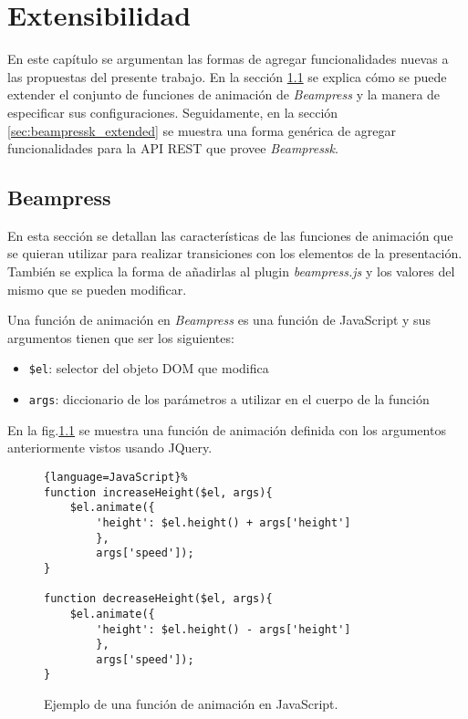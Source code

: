\chapter{Extensibilidad} %
\label{cha:extensibilidad}
 	En este capítulo se argumentan las formas de agregar funcionalidades nuevas a las propuestas del presente trabajo. En la sección \ref{sec:beampress_extended} se explica cómo se puede extender el conjunto de funciones de animación de \textit{Beampress} y la manera de especificar sus configuraciones. Seguidamente, en la sección \ref{sec:beampressk_extended} se muestra una forma genérica de agregar funcionalidades para la API REST que provee \textit{Beampressk}.  

	\section{Beampress} %
	\label{sec:beampress_extended}
		En esta sección se detallan las características de las funciones de animación que se quieran utilizar para realizar transiciones con los elementos de la presentación. También se explica la forma de añadirlas al plugin \textit{beampress.js} y los valores del mismo que se pueden modificar.

		Una función de animación en \textit{Beampress} es una función de JavaScript y sus argumentos tienen que ser los siguientes:

		\begin{itemize}
			\item \texttt{\$el}: selector del objeto DOM que modifica
			\item \texttt{args}: diccionario de los parámetros a utilizar en el cuerpo de la función
		\end{itemize}

		En la fig.\ref{fig:javascript_animation} se muestra una función de animación definida con los argumentos anteriormente vistos usando JQuery.

		\begin{figure}[htb]%
			\begin{lstlisting}{language=JavaScript}%
function increaseHeight($el, args){
    $el.animate({
    	'height': $el.height() + args['height'] 
    	}, 
    	args['speed']);
}

function decreaseHeight($el, args){
    $el.animate({
    	'height': $el.height() - args['height'] 
    	}, 
    	args['speed']);
}      
			\end{lstlisting}
		\caption{Ejemplo de una función de animación en JavaScript.} 
		\label{fig:javascript_animation} 
		\end{figure}		


